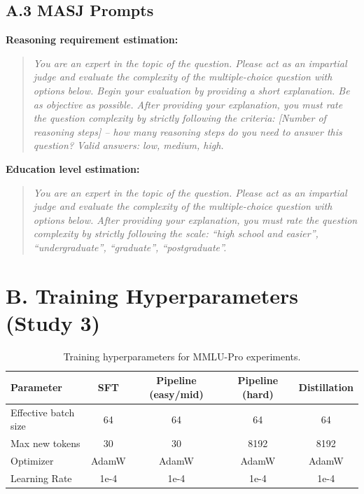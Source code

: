 \subsection*{A.3 MASJ Prompts}

\textbf{Reasoning requirement estimation:}
\begin{quote}
\textit{You are an expert in the topic of the question. Please act as an impartial judge and evaluate the complexity of the multiple-choice question with options below. Begin your evaluation by providing a short explanation. Be as objective as possible. After providing your explanation, you must rate the question complexity by strictly following the criteria: [Number of reasoning steps] -- how many reasoning steps do you need to answer this question? Valid answers: low, medium, high.}
\end{quote}

\textbf{Education level estimation:}
\begin{quote}
\textit{You are an expert in the topic of the question. Please act as an impartial judge and evaluate the complexity of the multiple-choice question with options below. After providing your explanation, you must rate the question complexity by strictly following the scale: ``high school and easier'', ``undergraduate'', ``graduate'', ``postgraduate''.}
\end{quote}

\section*{B. Training Hyperparameters (Study 3)}

\begin{table}[h]
\centering
\caption{Training hyperparameters for MMLU-Pro experiments.}
\begin{tabular}{lcccc}
\toprule
Parameter & SFT & Pipeline (easy/mid) & Pipeline (hard) & Distillation \\
\midrule
Effective batch size & 64 & 64 & 64 & 64 \\
Max new tokens & 30 & 30 & 8192 & 8192 \\
Optimizer & AdamW & AdamW & AdamW & AdamW \\
Learning Rate & 1e-4 & 1e-4 & 1e-4 & 1e-4 \\
\bottomrule
\end{tabular}
\label{tab:hyperparams_mmlu}
\end{table}

